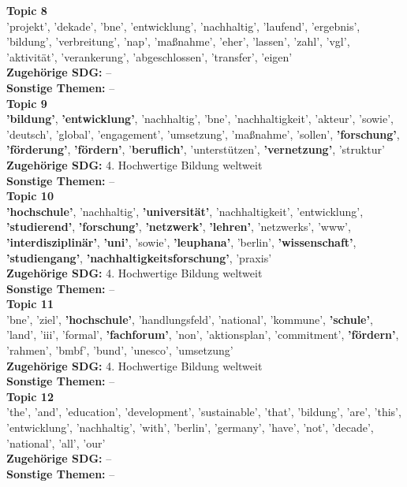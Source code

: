 \documentclass[letterpaper]{article}
\begin{document}
\textbf{Topic 8} \\
'projekt', 'dekade', 'bne', 'entwicklung', 'nachhaltig', 'laufend', 'ergebnis', 'bildung', 'verbreitung', 'nap', 'maßnahme', 'eher', 'lassen', 'zahl', 'vgl', 'aktivität', 'verankerung', 'abgeschlossen', 'transfer', 'eigen'  \\
\textbf{Zugehörige SDG:} --\\
\textbf{Sonstige Themen:} --\\

\textbf{Topic 9} \\
\textbf{'bildung'}, \textbf{'entwicklung'}, 'nachhaltig', 'bne', 'nachhaltigkeit', 'akteur', 'sowie', 'deutsch', 'global', 'engagement', 'umsetzung', 'maßnahme', 'sollen', \textbf{'forschung'}, \textbf{'förderung'}, \textbf{'fördern'}, '\textbf{beruflich'}, 'unterstützen', \textbf{'vernetzung'}, 'struktur' \\
\textbf{Zugehörige SDG:} 4. Hochwertige Bildung weltweit\\
\textbf{Sonstige Themen:} --\\

\textbf{Topic 10} \\
\textbf{'hochschule'}, 'nachhaltig', \textbf{'universität'}, 'nachhaltigkeit', 'entwicklung', \textbf{'studierend'}, \textbf{'forschung'}, \textbf{'netzwerk'}, \textbf{'lehren'}, 'netzwerks', 'www', \textbf{'interdisziplinär'}, \textbf{'uni'}, 'sowie', \textbf{'leuphana'}, 'berlin', \textbf{'wissenschaft'}, \textbf{'studiengang'}, \textbf{'nachhaltigkeitsforschung'}, 'praxis'\\
   \textbf{Zugehörige SDG:} 4. Hochwertige Bildung weltweit \\
   \textbf{Sonstige Themen:} --\\
   
\textbf{Topic 11} \\
'bne', 'ziel', \textbf{'hochschule'}, 'handlungsfeld', 'national', 'kommune', \textbf{'schule'}, 'land', 'iii', 'formal', \textbf{'fachforum'}, 'non', 'aktionsplan', 'commitment', \textbf{'fördern'}, 'rahmen', 'bmbf', 'bund', 'unesco', 'umsetzung' \\
   \textbf{Zugehörige SDG:} 4. Hochwertige Bildung weltweit\\
   \textbf{Sonstige Themen:} --\\
   
\textbf{Topic 12} \\
 'the', 'and', 'education', 'development', 'sustainable', 'that', 'bildung', 'are', 'this', 'entwicklung', 'nachhaltig', 'with', 'berlin', 'germany', 'have', 'not', 'decade', 'national', 'all', 'our' \\
    \textbf{Zugehörige SDG:} --\\
    \textbf{Sonstige Themen:} --\\
\end{document}
